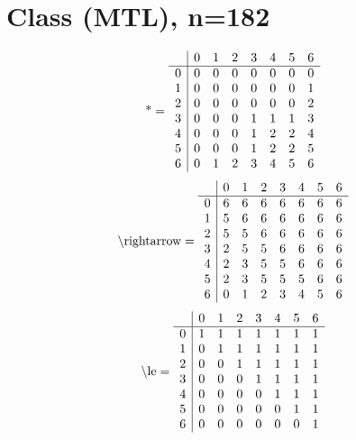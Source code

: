 \documentclass[11pt]{article}
\begin{document}
\section{Class (MTL), n=182}
\[\text{*} = 
\begin{array}{r | r r r r r r r}
 & 0 & 1 & 2 & 3 & 4 & 5 & 6 \\ \hline
0 & 0 & 0 & 0 & 0 & 0 & 0 & 0 \\
1 & 0 & 0 & 0 & 0 & 0 & 0 & 1 \\
2 & 0 & 0 & 0 & 0 & 0 & 0 & 2 \\
3 & 0 & 0 & 0 & 1 & 1 & 1 & 3 \\
4 & 0 & 0 & 0 & 1 & 2 & 2 & 4 \\
5 & 0 & 0 & 0 & 1 & 2 & 2 & 5 \\
6 & 0 & 1 & 2 & 3 & 4 & 5 & 6 \\
\end{array}
\]
\[\text{\textbackslash rightarrow} = 
\begin{array}{r | r r r r r r r}
 & 0 & 1 & 2 & 3 & 4 & 5 & 6 \\ \hline
0 & 6 & 6 & 6 & 6 & 6 & 6 & 6 \\
1 & 5 & 6 & 6 & 6 & 6 & 6 & 6 \\
2 & 5 & 5 & 6 & 6 & 6 & 6 & 6 \\
3 & 2 & 5 & 5 & 6 & 6 & 6 & 6 \\
4 & 2 & 3 & 5 & 5 & 6 & 6 & 6 \\
5 & 2 & 3 & 5 & 5 & 5 & 6 & 6 \\
6 & 0 & 1 & 2 & 3 & 4 & 5 & 6 \\
\end{array}
\]
\[\text{\textbackslash le} = 
\begin{array}{r | r r r r r r r}
 & 0 & 1 & 2 & 3 & 4 & 5 & 6 \\ \hline
0 & 1 & 1 & 1 & 1 & 1 & 1 & 1 \\
1 & 0 & 1 & 1 & 1 & 1 & 1 & 1 \\
2 & 0 & 0 & 1 & 1 & 1 & 1 & 1 \\
3 & 0 & 0 & 0 & 1 & 1 & 1 & 1 \\
4 & 0 & 0 & 0 & 0 & 1 & 1 & 1 \\
5 & 0 & 0 & 0 & 0 & 0 & 1 & 1 \\
6 & 0 & 0 & 0 & 0 & 0 & 0 & 1 \\
\end{array}
\]
\end{document}
